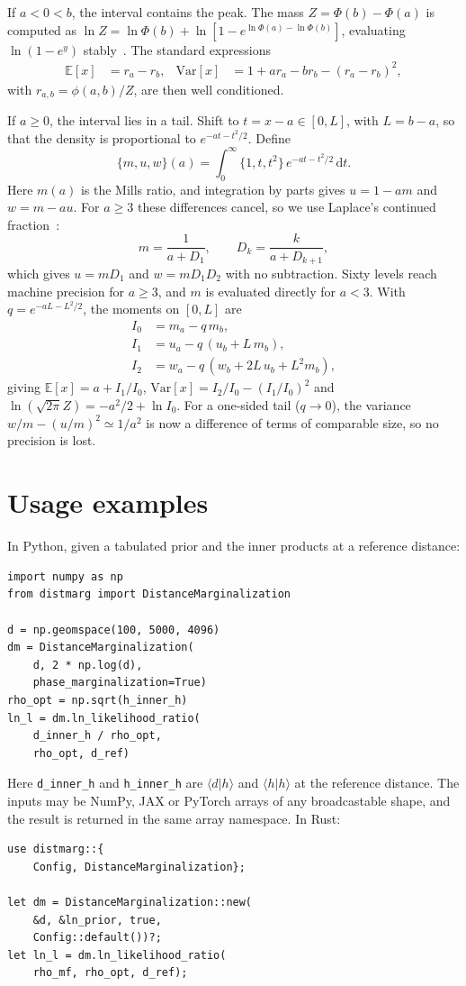 \documentclass[prd,twocolumn,nofootinbib,superscriptaddress,amsmath,amssymb]{revtex4-2}
\newcommand{\dd}{\mathrm{d}}
\newcommand{\E}{\mathbb{E}}
\newcommand{\Var}{\mathrm{Var}}
\begin{document}
If $a<0<b$,
the interval contains the peak.
The mass $Z=\Phi(b)-\Phi(a)$ is computed as $\ln Z=\ln\Phi(b)+\ln[1-e^{\ln\Phi(a)-\ln\Phi(b)}]$,
evaluating $\ln(1-e^{y})$ stably~\cite{Maechler2012}.
The standard expressions
\begin{align}
\E[x]&=r_a-r_b, & \Var[x]&=1+a r_a-b r_b-(r_a-r_b)^2,
\end{align}
with $r_{a,b}=\phi(a,b)/Z$,
are then well conditioned.

If $a\ge0$,
the interval lies in a tail.
Shift to $t=x-a\in[0,L]$,
with $L=b-a$,
so that the density is proportional to $e^{-at-t^2/2}$.
Define
\begin{equation}
\{m,u,w\}(a)=\int_0^\infty \{1,t,t^2\}\,e^{-at-t^2/2}\,\dd t .
\end{equation}
Here $m(a)$ is the Mills ratio,
and integration by parts gives $u=1-am$ and $w=m-au$.
For $a\ge3$ these differences cancel,
so we use Laplace's continued fraction~\cite{AbramowitzStegun1964}:
\begin{equation}
m=\frac{1}{a+D_1},\qquad D_k=\frac{k}{a+D_{k+1}},
\end{equation}
which gives $u=mD_1$ and $w=mD_1D_2$ with no subtraction.
Sixty levels reach machine precision for $a\ge3$,
and $m$ is evaluated directly for $a<3$.
With $q=e^{-aL-L^2/2}$,
the moments on $[0,L]$ are
\begin{align}
I_0&=m_a-q\,m_b,\nonumber\\
I_1&=u_a-q\,(u_b+L\,m_b),\nonumber\\
I_2&=w_a-q\,(w_b+2L\,u_b+L^2m_b),
\end{align}
giving $\E[x]=a+I_1/I_0$,
$\Var[x]=I_2/I_0-(I_1/I_0)^2$ and $\ln(\sqrt{2\pi}Z)=-a^2/2+\ln I_0$.
For a one-sided tail ($q\to0$),
the variance $w/m-(u/m)^2\simeq1/a^2$ is now a difference of terms of comparable size,
so no precision is lost.

\section{Usage examples}
\label{app:api}

In Python,
given a tabulated prior and the inner products at a reference distance:
\begin{verbatim}
import numpy as np
from distmarg import DistanceMarginalization

d = np.geomspace(100, 5000, 4096)
dm = DistanceMarginalization(
    d, 2 * np.log(d),
    phase_marginalization=True)
rho_opt = np.sqrt(h_inner_h)
ln_l = dm.ln_likelihood_ratio(
    d_inner_h / rho_opt,
    rho_opt, d_ref)
\end{verbatim}
Here \texttt{d\_inner\_h} and \texttt{h\_inner\_h} are $\langle d|h\rangle$ and $\langle h|h\rangle$ at the reference distance.
The inputs may be NumPy,
JAX or PyTorch arrays of any broadcastable shape,
and the result is returned in the same array namespace.
In Rust:
\begin{verbatim}
use distmarg::{
    Config, DistanceMarginalization};

let dm = DistanceMarginalization::new(
    &d, &ln_prior, true,
    Config::default())?;
let ln_l = dm.ln_likelihood_ratio(
    rho_mf, rho_opt, d_ref);
\end{verbatim}


\end{document}
